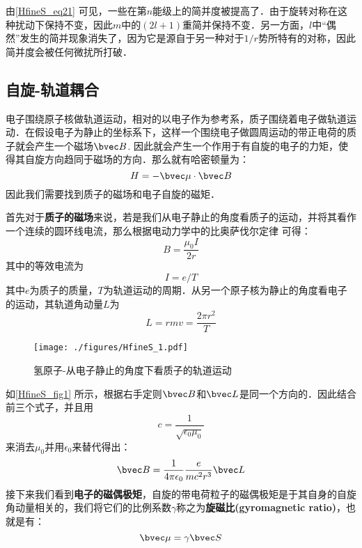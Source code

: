 由\autoref{HfineS_eq21} 可见，一些在第$n$能级上的简并度被提高了．由于旋转对称在这种扰动下保持不变，因此$m$中的$(2l+1)$重简并保持不变．另一方面，$l$中“偶然”发生的简并现象消失了，因为它是源自于另一种对于$1/r$势所特有的对称，因此简并度会被任何微扰所打破．

\subsection{自旋-轨道耦合}
电子围绕原子核做轨道运动，相对的以电子作为参考系，质子围绕着电子做轨道运动．在假设电子为静止的坐标系下，这样一个围绕电子做圆周运动的带正电荷的质子就会产生一个磁场$\bvec B$. 因此就会产生一个作用于有自旋的电子的力矩，使得其自旋方向趋同于磁场的方向．那么就有哈密顿量为：
\begin{equation}
H=-\bvec\mu \cdot \bvec B
\end{equation}
因此我们需要找到质子的磁场和电子自旋的磁矩．

首先对于\textbf{质子的磁场}来说，若是我们从电子静止的角度看质子的运动，并将其看作一个连续的圆环线电流，那么根据电动力学中的比奥萨伐尔定律 可得：
\begin{equation}
B=\frac{\mu_0I}{2r}
\end{equation}
其中的等效电流为
\begin{equation}
I=e/T
\end{equation}
其中$e$为质子的质量，$T$为轨道运动的周期．从另一个原子核为静止的角度看电子的运动，其轨道角动量$L$为
\begin{equation}
L=rmv=\frac{2\pi r^2}{T}
\end{equation}
\begin{figure}[ht]
\centering
\texttt{[image: ./figures/HfineS\_1.pdf]}
\caption{氢原子-从电子静止的角度下看质子的轨道运动} \label{HfineS_fig1}
\end{figure}
如\autoref{HfineS_fig1} 所示，根据右手定则$\bvec B$和$\bvec L$是同一个方向的．因此结合前三个式子，并且用
\begin{equation}
c=\frac{1}{\sqrt{\epsilon_0\mu_0}}
\end{equation}
来消去$\mu_0$并用$\epsilon_0$来替代得出：
\begin{equation}
\bvec B = \frac{1}{4\pi\epsilon_0}\frac{e}{mc^2r^3}\bvec L
\end{equation}
接下来我们看到\textbf{电子的磁偶极矩}，自旋的带电荷粒子的磁偶极矩是于其自身的自旋角动量相关的，我们将它们的比例系数$\gamma$称之为\textbf{旋磁比(gyromagnetic
ratio)}，也就是有：
\begin{equation}
\bvec\mu=\gamma\bvec S
\end{equation}


